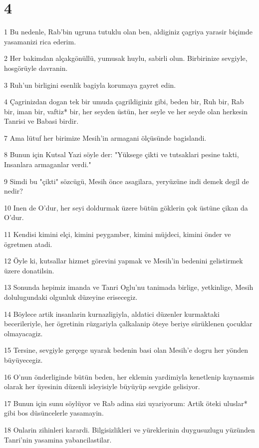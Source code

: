 \chapter{4}

\par 1 Bu nedenle, Rab'bin ugruna tutuklu olan ben, aldiginiz çagriya yarasir biçimde yasamanizi rica ederim.
\par 2 Her bakimdan alçakgönüllü, yumusak huylu, sabirli olun. Birbirinize sevgiyle, hosgörüyle davranin.
\par 3 Ruh'un birligini esenlik bagiyla korumaya gayret edin.
\par 4 Çagrinizdan dogan tek bir umuda çagrildiginiz gibi, beden bir, Ruh bir, Rab bir, iman bir, vaftiz* bir, her seyden üstün, her seyle ve her seyde olan herkesin Tanrisi ve Babasi birdir.
\par 7 Ama lütuf her birimize Mesih'in armagani ölçüsünde bagislandi.
\par 8 Bunun için Kutsal Yazi söyle der: "Yüksege çikti ve tutsaklari pesine takti, Insanlara armaganlar verdi."
\par 9 Simdi bu "çikti" sözcügü, Mesih önce asagilara, yeryüzüne indi demek degil de nedir?
\par 10 Inen de O'dur, her seyi doldurmak üzere bütün göklerin çok üstüne çikan da O'dur.
\par 11 Kendisi kimini elçi, kimini peygamber, kimini müjdeci, kimini önder ve ögretmen atadi.
\par 12 Öyle ki, kutsallar hizmet görevini yapmak ve Mesih'in bedenini gelistirmek üzere donatilsin.
\par 13 Sonunda hepimiz imanda ve Tanri Oglu'nu tanimada birlige, yetkinlige, Mesih dolulugundaki olgunluk düzeyine erisecegiz.
\par 14 Böylece artik insanlarin kurnazligiyla, aldatici düzenler kurmaktaki becerileriyle, her ögretinin rüzgariyla çalkalanip öteye beriye sürüklenen çocuklar olmayacagiz.
\par 15 Tersine, sevgiyle gerçege uyarak bedenin basi olan Mesih'e dogru her yönden büyüyecegiz.
\par 16 O'nun önderliginde bütün beden, her eklemin yardimiyla kenetlenip kaynasmis olarak her üyesinin düzenli isleyisiyle büyüyüp sevgide gelisiyor.
\par 17 Bunun için sunu söylüyor ve Rab adina sizi uyariyorum: Artik öteki uluslar* gibi bos düsüncelerle yasamayin.
\par 18 Onlarin zihinleri karardi. Bilgisizlikleri ve yüreklerinin duygusuzlugu yüzünden Tanri'nin yasamina yabancilastilar.
